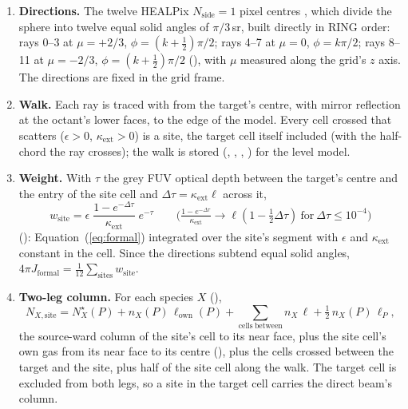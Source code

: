 \begin{enumerate}
\item \textbf{Directions.} The twelve HEALPix $N_{\mathrm{side}}=1$ pixel
  centres \citep{Gorski2005}, which divide the sphere into twelve equal solid
  angles of $\pi/3$\,sr, built directly in RING order: rays 0--3 at
  $\mu=+2/3$, $\phi=(k+\frac12)\pi/2$; rays 4--7 at $\mu=0$, $\phi=k\pi/2$;
  rays 8--11 at $\mu=-2/3$, $\phi=(k+\frac12)\pi/2$ (),
  with $\mu$ measured along the grid's $z$ axis. The directions are fixed in
  the grid frame.
\item \textbf{Walk.} Each ray is traced with  from the target's
  centre, with mirror reflection at the octant's lower faces, to the edge of
  the model. Every cell crossed that scatters ($\epsilon>0$, $\kappa_{\mathrm{ext}}>0$)
  is a site, the target cell itself included (with the half-chord the ray
  crosses); the walk is stored (,
  , , ) for the level model.
\item \textbf{Weight.} With $\tau$ the grey FUV optical depth between the
  target's centre and the entry of the site cell and $\Delta\tau=\kappa_{\mathrm{ext}}\ell$
  across it,
  \begin{equation}
    w_{\mathrm{site}} = \epsilon\;\frac{1-e^{-\Delta\tau}}{\kappa_{\mathrm{ext}}}\;e^{-\tau}
    \qquad\bigl(\tfrac{1-e^{-\Delta\tau}}{\kappa_{\mathrm{ext}}}\to\ell(1-\tfrac12\Delta\tau)\ \text{for}\ \Delta\tau\le10^{-4}\bigr)
    \label{eq:siteweight}
  \end{equation}
  (): Equation~(\ref{eq:formal}) integrated over the
  site's segment with $\epsilon$ and $\kappa_{\mathrm{ext}}$ constant in the cell.
  Since the directions subtend equal solid angles,
  $4\pi J_{\mathrm{formal}}=\frac1{12}\sum_{\mathrm{sites}}w_{\mathrm{site}}$.
\item \textbf{Two-leg column.} For each species $X$ (),
  \begin{equation}
    N_{X,\mathrm{site}} = N_X^{\star}(P) + n_X(P)\,\ell_{\mathrm{own}}(P)
       + \sum_{\mathrm{cells\ between}} n_X\,\ell + \tfrac12\,n_X(P)\,\ell_P ,
    \label{eq:twoleg}
  \end{equation}
  the source-ward column of the site's cell to its near face, plus the site
  cell's own gas from its near face to its centre (), plus the
  cells crossed between the target and the site, plus half of the site cell
  along the walk. The target cell is excluded from both legs, so a site in the
  target cell carries the direct beam's column.
\end{enumerate}

